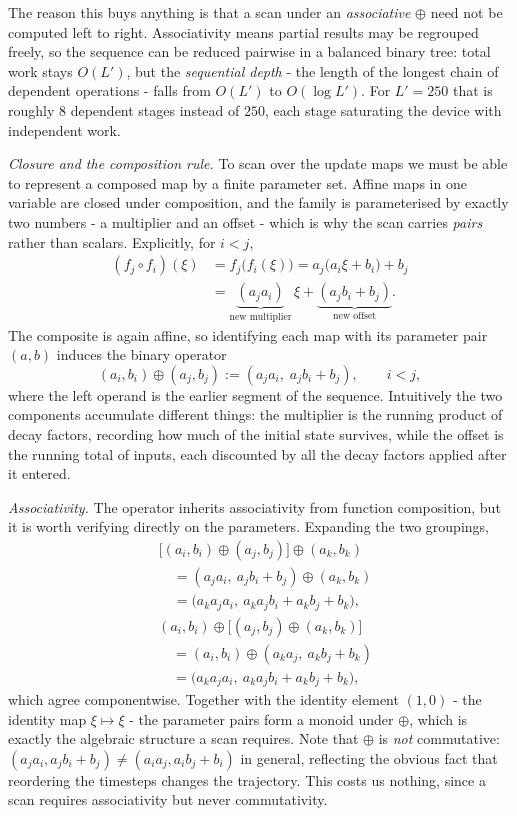 \documentclass[10pt,a4paper,twocolumn]{article}
\begin{document}
	The reason this buys anything is that a scan under an \emph{associative} $\oplus$ need not be computed left to right. Associativity means partial results may be regrouped freely, so the sequence can be reduced pairwise in a balanced binary tree: total work stays $O(L')$, but the \emph{sequential depth} - the length of the longest chain of dependent operations - falls from $O(L')$ to $O(\log L')$. For $L' = 250$ that is roughly $8$ dependent stages instead of $250$, each stage saturating the device with independent work.
		
	\textit{Closure and the composition rule.} To scan over the update maps we must be able to represent a composed map by a finite parameter set. Affine maps in one variable are closed under composition, and the family is parameterised by exactly two numbers - a multiplier and an offset - which is why the scan carries \emph{pairs} rather than scalars. Explicitly, for $i < j$,
	$$\begin{aligned}(f_j \circ f_i)(\xi) &= f_j\bigl(f_i(\xi)\bigr) = a_j\bigl(a_i \xi + b_i\bigr) + b_j \\ &= \underbrace{(a_j a_i)}_{\text{new multiplier}}\,\xi + \underbrace{(a_j b_i + b_j)}_{\text{new offset}}.\end{aligned}$$
	The composite is again affine, so identifying each map with its parameter pair $(a,b)$ induces the binary operator
	$$(a_i, b_i) \oplus (a_j, b_j) := (a_j a_i,\; a_j b_i + b_j), \qquad i < j,$$
	where the left operand is the earlier segment of the sequence. Intuitively the two components accumulate different things: the multiplier is the running product of decay factors, recording how much of the initial state survives, while the offset is the running total of inputs, each discounted by all the decay factors applied after it entered.
		
	\textit{Associativity.} The operator inherits associativity from function composition, but it is worth verifying directly on the parameters. Expanding the two groupings,
	$$\begin{aligned}&\bigl[(a_i,b_i) \oplus (a_j,b_j)\bigr] \oplus (a_k,b_k) \\ &\quad= (a_j a_i,\ a_j b_i + b_j) \oplus (a_k,b_k) \\ &\quad= \bigl(a_k a_j a_i,\ a_k a_j b_i + a_k b_j + b_k\bigr),\end{aligned}$$
	$$\begin{aligned}&(a_i,b_i) \oplus \bigl[(a_j,b_j) \oplus (a_k,b_k)\bigr] \\ &\quad= (a_i,b_i) \oplus (a_k a_j,\ a_k b_j + b_k) \\ &\quad= \bigl(a_k a_j a_i,\ a_k a_j b_i + a_k b_j + b_k\bigr),\end{aligned}$$
	which agree componentwise. Together with the identity element $(1, 0)$ - the identity map $\xi \mapsto \xi$ - the parameter pairs form a monoid under $\oplus$, which is exactly the algebraic structure a scan requires. Note that $\oplus$ is \emph{not} commutative: $(a_j a_i, a_j b_i + b_j) \neq (a_i a_j, a_i b_j + b_i)$ in general, reflecting the obvious fact that reordering the timesteps changes the trajectory. This costs us nothing, since a scan requires associativity but never commutativity.
		
\end{document}
